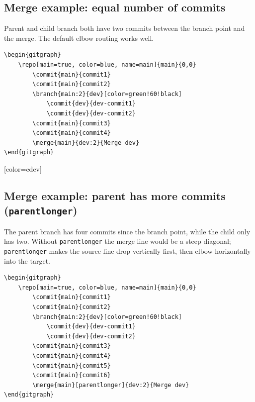 \documentclass{article}
\newcommand{\opt}[1]{\texttt{#1}}
\begin{document}
        \subsection{Merge example: equal number of commits}

            Parent and child branch both have two commits between the branch point and the merge. The default elbow routing works well.

            \begin{verbatim}
\begin{gitgraph}
    \repo[main=true, color=blue, name=main]{main}{0,0}
        \commit{main}{commit1}
        \commit{main}{commit2}
        \branch{main:2}{dev}[color=green!60!black]
            \commit{dev}{dev-commit1}
            \commit{dev}{dev-commit2}
        \commit{main}{commit3}
        \commit{main}{commit4}
        \merge{main}{dev:2}{Merge dev}
\end{gitgraph}
            \end{verbatim}

            \begin{center}
                \begin{gitgraph}
                        [color=cdev]
                \end{gitgraph}
        \end{center}

        \subsection{Merge example: parent has more commits (\opt{parentlonger})}

            The parent branch has four commits since the branch point, while the child only has two.
            Without \opt{parentlonger} the merge line would be a steep diagonal; \opt{parentlonger} makes the source line drop vertically first, then elbow horizontally into the target.

            \begin{verbatim}
\begin{gitgraph}
    \repo[main=true, color=blue, name=main]{main}{0,0}
        \commit{main}{commit1}
        \commit{main}{commit2}
        \branch{main:2}{dev}[color=green!60!black]
            \commit{dev}{dev-commit1}
            \commit{dev}{dev-commit2}
        \commit{main}{commit3}
        \commit{main}{commit4}
        \commit{main}{commit5}
        \commit{main}{commit6}
        \merge{main}[parentlonger]{dev:2}{Merge dev}
\end{gitgraph}
            \end{verbatim}
\end{document}
